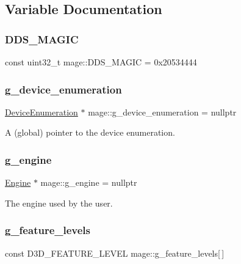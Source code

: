 \subsection{Variable Documentation}
\hypertarget{namespacemage_a52f784e41b51fee843891c6b5e9be479}{}\label{namespacemage_a52f784e41b51fee843891c6b5e9be479} 
\subsubsection{\texorpdfstring{D\+D\+S\+\_\+\+M\+A\+G\+IC}{DDS\_MAGIC}}
{\footnotesize\ttfamily const uint32\+\_\+t mage\+::\+D\+D\+S\+\_\+\+M\+A\+G\+IC = 0x20534444}

\hypertarget{namespacemage_a73e54b9b368875ed0281ced59e2fca7e}{}\label{namespacemage_a73e54b9b368875ed0281ced59e2fca7e} 
\subsubsection{\texorpdfstring{g\+\_\+device\+\_\+enumeration}{g\_device\_enumeration}}
{\footnotesize\ttfamily \hyperlink{classmage_1_1_device_enumeration}{Device\+Enumeration} $\ast$ mage\+::g\+\_\+device\+\_\+enumeration = nullptr}

A (global) pointer to the device enumeration. \hypertarget{namespacemage_a84bf83f1e8779d884452cdf08f56c19a}{}\label{namespacemage_a84bf83f1e8779d884452cdf08f56c19a} 
\subsubsection{\texorpdfstring{g\+\_\+engine}{g\_engine}}
{\footnotesize\ttfamily \hyperlink{classmage_1_1_engine}{Engine} $\ast$ mage\+::g\+\_\+engine = nullptr}

The engine used by the user. \hypertarget{namespacemage_add3b7e051df553262371e077d9d66fd9}{}\label{namespacemage_add3b7e051df553262371e077d9d66fd9} 
\subsubsection{\texorpdfstring{g\+\_\+feature\+\_\+levels}{g\_feature\_levels}}
{\footnotesize\ttfamily const D3\+D\+\_\+\+F\+E\+A\+T\+U\+R\+E\+\_\+\+L\+E\+V\+EL mage\+::g\+\_\+feature\+\_\+levels\mbox{[}$\,$\mbox{]}}

